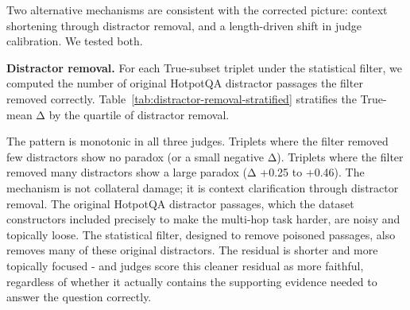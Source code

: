 Two alternative mechanisms are consistent with the corrected picture: context shortening through distractor removal, and a length-driven shift in judge calibration. We tested both.

\textbf{Distractor removal.} For each True-subset triplet under the statistical filter, we computed the number of original HotpotQA distractor passages the filter removed correctly. Table~\ref{tab:distractor-removal-stratified} stratifies the True-mean Δ by the quartile of distractor removal.

\begin{table}[H]
\centering
\small
{}
\caption{True-subset Δ stratified by quartile of original distractor passages removed by the statistical filter. The paradox grows monotonically with the number of distractors removed, in all three judges. The largest Δ in the high-quartile cell (Q3) reaches +0.461 for DeepSeek and +0.335 for Gemma.}
\label{tab:distractor-removal-stratified}
\end{table}

The pattern is monotonic in all three judges. Triplets where the filter removed few distractors show no paradox (or a small negative Δ). Triplets where the filter removed many distractors show a large paradox (Δ +0.25 to +0.46). The mechanism is not collateral damage; it is context clarification through distractor removal. The original HotpotQA distractor passages, which the dataset constructors included precisely to make the multi-hop task harder, are noisy and topically loose. The statistical filter, designed to remove poisoned passages, also removes many of these original distractors. The residual is shorter and more topically focused - and judges score this cleaner residual as more faithful, regardless of whether it actually contains the supporting evidence needed to answer the question correctly.

